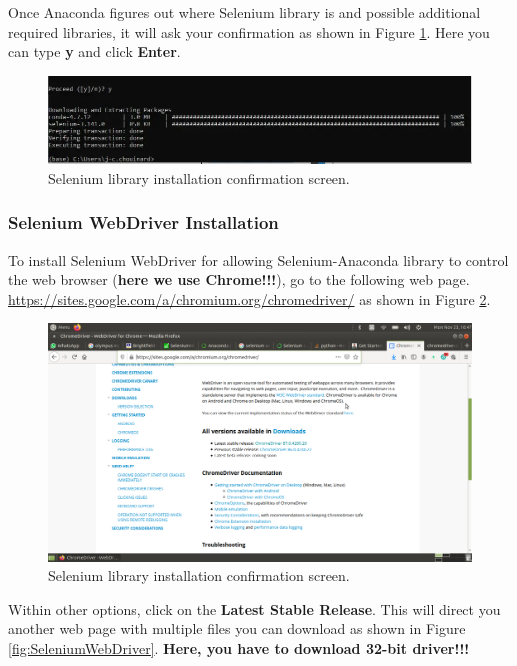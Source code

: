 Once Anaconda figures out where Selenium library is and possible additional required
libraries, it will ask your confirmation as shown in Figure
\ref{fig:SeleniumAnacondaConfirm}. Here you can type \textbf{y} and click \textbf{Enter}.

\begin{figure}[H]
    \centering
    \includegraphics[angle=0,origin=c,width = .8\linewidth]{Section_Ethernet/Figures/confirm-screen.jpg}
    \caption{Selenium library installation confirmation screen.}
    \label{fig:SeleniumAnacondaConfirm}
\end{figure}

\subsubsection{Selenium WebDriver Installation}
To install Selenium WebDriver for allowing Selenium-Anaconda library to control the
web browser (\textbf{here we use Chrome!!!}), go to the following web page. 
\url{https://sites.google.com/a/chromium.org/chromedriver/} as shown in Figure
\ref{fig:WebDriverDownload}. 
\begin{figure}[H]
    \centering
    \includegraphics[angle=0,origin=c,width = .8\linewidth]{Section_Ethernet/Figures/WebDriverDownload.png}
    \caption{Selenium library installation confirmation screen.}
    \label{fig:WebDriverDownload}
\end{figure}

Within other options, click on the \textbf{Latest Stable Release}. This will direct you 
another web page with multiple files you can download as shown in Figure
\ref{fig:SeleniumWebDriver}. \textbf{Here, you have to download 32-bit driver!!!}


